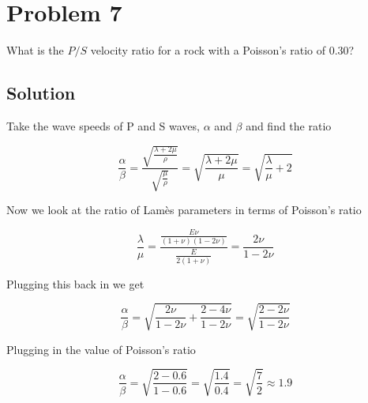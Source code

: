 \section*{Problem 7}

What is the $P/S$ velocity ratio for a rock with a Poisson's ratio of 0.30?

\subsection*{Solution}

Take the wave speeds of P and S waves, $\alpha$ and $\beta$ and find the ratio

\begin{equation*}
    \frac{\alpha}{\beta} = 
    \frac{\sqrt{\frac{\lambda+2\mu}{\rho}}}{\sqrt{\frac{\mu}{\rho}}} =
    \sqrt{\frac{\lambda + 2\mu}{\mu}} = \sqrt{\frac{\lambda}{\mu} + 2}
\end{equation*}

Now we look at the ratio of Lamès parameters in terms of Poisson's ratio

\begin{equation*}
    \frac{\lambda}{\mu} = 
    \frac{\frac{E\nu}{(1+\nu)(1-2\nu)}}{\frac{E}{2(1+\nu)}} = 
    \frac{2\nu}{1-2\nu}
\end{equation*}

Plugging this back in we get

\begin{equation*}
    \frac{\alpha}{\beta} = 
    \sqrt{\frac{2\nu}{1-2\nu} + \frac{2 - 4\nu}{1 - 2\nu}} = 
    \sqrt{\frac{2 - 2\nu}{1 - 2\nu}}
\end{equation*}

Plugging in the value of Poisson's ratio

\begin{equation*}
    \frac{\alpha}{\beta} = 
    \sqrt{\frac{2 - 0.6}{1 - 0.6}} = \sqrt{\frac{1.4}{0.4}} =
    \sqrt{\frac{7}{2}} \approx 1.9
\end{equation*}